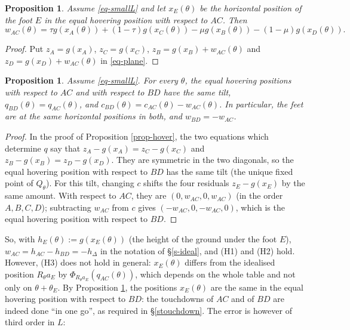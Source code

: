 \documentclass[a4paper,11pt,twoside,leqno]{article}
\newtheorem{prop}[teo]{Proposition}
\numberwithin{equation}{section}
\begin{document}
\begin{prop}\label{prop-w}
Assume \eqref{eq-smallL} and let $x_E(\theta)$ be the horizontal position of the foot $E$ in the equal hovering position with respect to $AC$. Then
\[
w_{AC}(\theta) = \tau g(x_A(\theta)) + (1-\tau) g(x_C(\theta)) - \mu g(x_B(\theta)) - (1-\mu) g(x_D(\theta)).
\]
\end{prop}
\begin{proof}
Put $z_A = g(x_A)$, $z_C = g(x_C)$, $z_B = g(x_B) + w_{AC}(\theta)$ and $z_D = g(x_D) + w_{AC}(\theta)$ in \eqref{eq-plane}.
\end{proof}

\begin{prop}\label{prop-common}
Assume \eqref{eq-smallL}. For every $\theta$, the equal hovering positions with respect to $AC$ and with respect to $BD$ have the same tilt, $q_{BD}(\theta) = q_{AC}(\theta)$, and $c_{BD}(\theta) = c_{AC}(\theta) - w_{AC}(\theta)$. In particular, the feet are at the same horizontal positions in both, and $w_{BD} = - w_{AC}$.
\end{prop}
\begin{proof}
In the proof of Proposition \ref{prop-hover}, the two equations which determine $q$ say that $z_A - g(x_A) = z_C - g(x_C)$ and $z_B - g(x_B) = z_D - g(x_D)$. They are symmetric in the two diagonals, so the equal hovering position with respect to $BD$ has the same tilt (the unique fixed point of $Q_\theta$). For this tilt, changing $c$ shifts the four residuals $z_E - g(x_E)$ by the same amount. With respect to $AC$, they are $(0, w_{AC}, 0, w_{AC})$ (in the order $A,B,C,D$); subtracting $w_{AC}$ from $c$ gives $(-w_{AC},0,-w_{AC},0)$, which is the equal hovering position with respect to $BD$.
\end{proof}

So, with $h_E(\theta) := g(x_E(\theta))$ (the height of the ground under the foot $E$), $w_{AC} = h_{AC} - h_{BD} = - h_\Delta$ in the notation of \S{}\ref{s-ideal}, and (H1) and (H2) hold. However, (H3) does not hold in general: $x_E(\theta)$ differs from the idealised position $R_\theta a_E$ by $\Phi_{R_\theta a_E}(q_{AC}(\theta))$, which depends on the whole table and not only on $\theta + \theta_E$. By Proposition \ref{prop-common}, the positions $x_E(\theta)$ are the same in the equal hovering position with respect to $BD$: the touchdowns of $AC$ and of $BD$ are indeed done ``in one go'', as required in \S{}\ref{stouchdown}. The error is however of third order in $L$:
\end{document}
